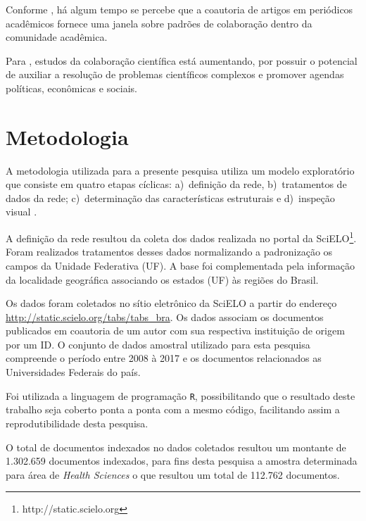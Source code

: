 \documentclass[12pt]{article}
\begin{document}
Conforme \cite{Newman2004}, há algum tempo se percebe que a coautoria de artigos em periódicos acadêmicos fornece uma janela sobre padrões de colaboração dentro da comunidade acadêmica. 

Para \cite{Sonnenwald}, estudos da colaboração científica está aumentando, por possuir o potencial de auxiliar a resolução de problemas científicos complexos e promover agendas políticas, econômicas e sociais. 

\section{Metodologia} 

A metodologia utilizada para a presente pesquisa utiliza um modelo exploratório que consiste em quatro etapas cíclicas: 
a)~definição da rede, 
b)~tratamentos de dados da rede; 
c)~determinação das características estruturais e 
d)~inspeção visual \cite{de2018exploratory}.

A definição da rede resultou da coleta dos dados realizada no portal da SciELO\footnote{http://static.scielo.org}. 
Foram  realizados tratamentos desses dados normalizando a padronização os campos da Unidade Federativa (UF). 
A base foi complementada pela informação da localidade geográfica associando os estados (UF) às regiões do Brasil. 

Os dados foram coletados no sítio eletrônico da SciELO a partir do endereço \url{http://static.scielo.org/tabs/tabs_bra}. Os dados associam os documentos publicados em coautoria de um autor com sua respectiva instituição de origem por um ID. O conjunto de dados amostral utilizado para esta pesquisa compreende o período entre 2008 à 2017 e os documentos relacionados as Universidades Federais do país.  

Foi utilizada a linguagem de programação \texttt R, possibilitando que o resultado deste trabalho seja coberto ponta a ponta com a mesmo código, facilitando assim a reprodutibilidade desta pesquisa.

O total de documentos indexados no dados coletados resultou um montante de 1.302.659 documentos indexados, para fins desta pesquisa a amostra determinada para área de \textit{Health Sciences} o que resultou um total de 112.762 documentos.
\end{document}
